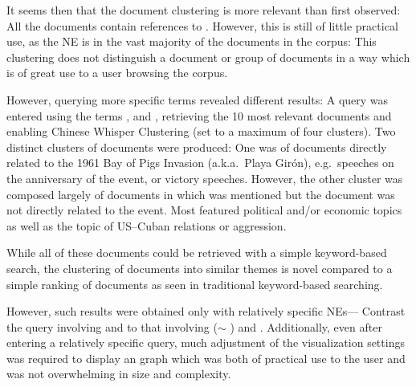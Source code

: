 It seems then that the document clustering is more relevant than first observed: All the documents contain references to . However, this is still of little practical use, as the NE  is in the vast majority of the documents in the corpus: This clustering does not distinguish a document or group of documents in a way which is of great use to a user browsing the corpus.

However, querying more specific terms revealed different results: A query was entered using the terms , and , retrieving the 10 most relevant documents and enabling Chinese Whisper Clustering (set to a maximum of four clusters). Two distinct clusters of documents were produced: One was of documents directly related to the 1961 Bay of Pigs Invasion (a.k.a.\ Playa Gir\'{o}n), e.g.\ speeches on the anniversary of the event, or victory speeches. However, the other cluster was composed largely of documents in which  was mentioned but the document was not directly related to the event. Most featured political and/or economic topics as well as the topic of US--Cuban relations or aggression.

While all of these documents could be retrieved with a simple keyword-based search, the clustering of documents into similar themes is novel compared to a simple ranking of documents as seen in traditional keyword-based searching.

However, such results were obtained only with relatively specific NEs--- Contrast the query involving  and  to that involving  ($\sim$ )  and . Additionally, even after entering a relatively specific query, much adjustment of the visualization settings was required to display an graph which was both of practical use to the user and was not overwhelming in size and complexity.